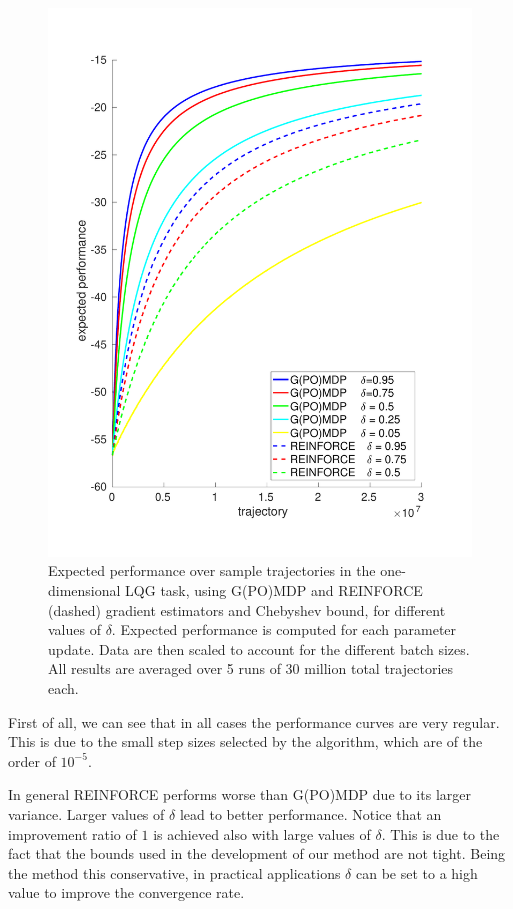 \begin{figure}[t!]
\includegraphics[width = \textwidth]{Images/chebyshev.pdf}
\caption[Expected performance over sample trajectories in the one-dimensional LQG task for different gradient estimators ad values of $\delta$.]{Expected performance over sample trajectories in the one-dimensional \ac{LQG} task, using G(PO)MDP and REINFORCE (dashed) gradient estimators and Chebyshev bound, for different values of $\delta$. Expected performance is computed for each parameter update. Data are then scaled to account for the different batch sizes. All results are averaged over 5 runs of 30 million total trajectories each.}
\label{fig:1}
\end{figure}

First of all, we can see that in all cases the performance curves are very regular. This is due to the small step sizes selected by the algorithm, which are of the order of $10^{-5}$.

In general REINFORCE performs worse than G(PO)MDP due to its larger variance.
Larger values of $\delta$  lead to better performance. Notice that an improvement ratio of $1$ is achieved also with large values of $\delta$. This is due to the fact that the bounds used in the development of our method are not tight. Being the method this conservative, in practical applications $\delta$ can be set to a high value to improve the convergence rate.

